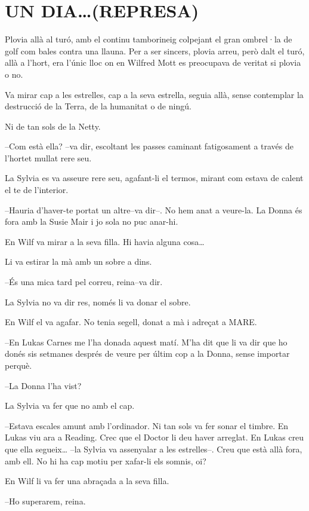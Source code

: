 \chapter*{UN DIA\ldots (REPRESA)}

Plovia allà al turó, amb el continu tamborineig colpejant el gran
ombrel·la de golf com bales contra una llauna. Per a ser sincers, plovia
arreu, però dalt el turó, allà a l'hort, era l'únic lloc on en Wilfred
Mott es preocupava de veritat si plovia o no.

Va mirar cap a les estrelles, cap a la seva estrella, seguia allà, sense
contemplar la destrucció de la Terra, de la humanitat o de ningú.

Ni de tan sols de la Netty.

--Com està ella? --va dir, escoltant les passes caminant fatigosament a
través de l'hortet mullat rere seu.

La Sylvia es va asseure rere seu, agafant-li el termos, mirant com
estava de calent el te de l'interior.

--Hauria d'haver-te portat un altre--va dir--. No hem anat a veure-la.
La Donna és fora amb la Susie Mair i jo sola no puc anar-hi.

En Wilf va mirar a la seva filla. Hi havia alguna cosa\ldots{}

Li va estirar la mà amb un sobre a dins.

--És una mica tard pel correu, reina--va dir.

La Sylvia no va dir res, només li va donar el sobre.

En Wilf el va agafar. No tenia segell, donat a mà i adreçat a MARE.

--En Lukas Carnes me l'ha donada aquest matí. M'ha dit que li va dir que
ho donés sis setmanes després de veure per últim cop a la Donna, sense
importar perquè.

--La Donna l'ha vist?

La Sylvia va fer que no amb el cap.

--Estava escales amunt amb l'ordinador. Ni tan sols va fer sonar el
timbre. En Lukas viu ara a Reading. Crec que el Doctor li deu haver
arreglat. En Lukas creu que ella segueix\ldots{} --la Sylvia va
assenyalar a les estrelles--. Creu que està allà fora, amb ell. No hi ha
cap motiu per xafar-li els somnis, oi?

En Wilf li va fer una abraçada a la seva filla.

--Ho superarem, reina.

